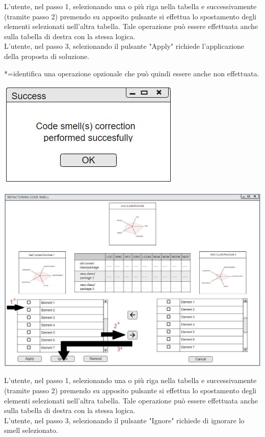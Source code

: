 \documentclass[11pt]{article}
\begin{document}
			\flushleft
			L'utente, nel passo 1, selezionando una o più riga nella tabella e successivamente (tramite passo 2) premendo su apposito pulsante si effettua lo spostamento degli elementi selezionati nell'altra tabella. Tale operazione può essere effettuata anche sulla tabella di destra con la stessa logica.\vspace{0.2cm}
			\\L'utente, nel passo 3, selezionando il pulsante "Apply" richiede l'applicazione della proposta di soluzione.\vspace{0.3cm}
			
			*=identifica una operazione opzionale che può quindi essere anche non effettuata.
			\vspace{0.5cm}
			
			\centering	
			\includegraphics[scale=0.9]{pop-up_successo.jpg}\\
			
			\includegraphics[width=\columnwidth]{mock-up_refactoring2_2.jpg}
			
			\flushleft
			L'utente, nel passo 1, selezionando una o più riga nella tabella e successivamente (tramite passo 2) premendo su apposito pulsante si effettua lo spostamento degli elementi selezionati nell'altra tabella. Tale operazione può essere effettuata anche sulla tabella di destra con la stessa logica.\vspace{0.2cm}
			\\L'utente, nel passo 3, selezionando il pulsante "Ignore" richiede di ignorare lo smell selezionato.\vspace{0.3cm}
			
\end{document}
